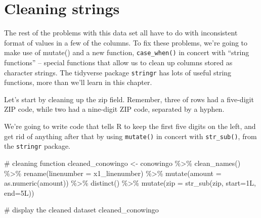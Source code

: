 \documentclass[
  letterpaper,
  DIV=11,
  numbers=noendperiod]{scrreprt}
\newenvironment{Shaded}{\begin{snugshade}}{\end{snugshade}}
\newcommand{\AttributeTok}[1]{\textcolor[rgb]{0.40,0.45,0.13}{#1}}
\newcommand{\CommentTok}[1]{\textcolor[rgb]{0.37,0.37,0.37}{#1}}
\newcommand{\FunctionTok}[1]{\textcolor[rgb]{0.28,0.35,0.67}{#1}}
\newcommand{\NormalTok}[1]{\textcolor[rgb]{0.00,0.23,0.31}{#1}}
\newcommand{\OtherTok}[1]{\textcolor[rgb]{0.00,0.23,0.31}{#1}}
\newcommand{\SpecialCharTok}[1]{\textcolor[rgb]{0.37,0.37,0.37}{#1}}
\begin{document}
\hypertarget{cleaning-strings}{%
\section{Cleaning strings}\label{cleaning-strings}}

The rest of the problems with this data set all have to do with
inconsistent format of values in a few of the columns. To fix these
problems, we're going to make use of mutate() and a new function,
\texttt{case\_when()} in concert with ``string functions'' -- special
functions that allow us to clean up columns stored as character strings.
The tidyverse package \texttt{stringr} has lots of useful string
functions, more than we'll learn in this chapter.

Let's start by cleaning up the zip field. Remember, three of rows had a
five-digit ZIP code, while two had a nine-digit ZIP code, separated by a
hyphen.

We're going to write code that tells R to keep the first five digits on
the left, and get rid of anything after that by using \texttt{mutate()}
in concert with \texttt{str\_sub()}, from the \texttt{stringr} package.

\begin{Shaded}
\begin{Highlighting}[]
\CommentTok{\# cleaning function}
\NormalTok{cleaned\_conowingo }\OtherTok{\textless{}{-}}\NormalTok{ conowingo }\SpecialCharTok{\%\textgreater{}\%}
  \FunctionTok{clean\_names}\NormalTok{() }\SpecialCharTok{\%\textgreater{}\%} 
  \FunctionTok{rename}\NormalTok{(}\AttributeTok{linenumber =}\NormalTok{ x1\_linenumber) }\SpecialCharTok{\%\textgreater{}\%} 
  \FunctionTok{mutate}\NormalTok{(}\AttributeTok{amount =} \FunctionTok{as.numeric}\NormalTok{(amount)) }\SpecialCharTok{\%\textgreater{}\%} 
  \FunctionTok{distinct}\NormalTok{() }\SpecialCharTok{\%\textgreater{}\%}
  \FunctionTok{mutate}\NormalTok{(}\AttributeTok{zip =} \FunctionTok{str\_sub}\NormalTok{(zip, }\AttributeTok{start=}\NormalTok{1L, }\AttributeTok{end=}\NormalTok{5L))}
  

\CommentTok{\# display the cleaned dataset}
\NormalTok{cleaned\_conowingo}
\end{Highlighting}
\end{Shaded}
\end{document}
